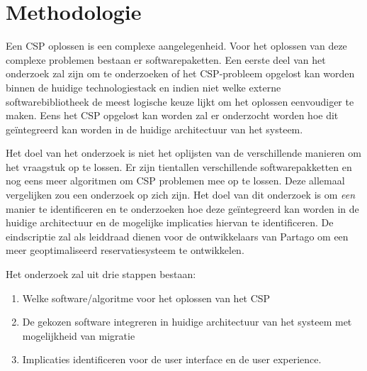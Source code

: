 
\section{Methodologie}
\label{sec:methodologie}
Een CSP oplossen is een complexe aangelegenheid. Voor het oplossen van deze complexe problemen bestaan er softwarepaketten. Een eerste deel van het onderzoek zal zijn om te onderzoeken of het CSP-probleem opgelost kan worden binnen de huidige technologiestack en indien niet welke externe softwarebibliotheek de meest logische keuze lijkt om het oplossen eenvoudiger te maken. Eens het CSP opgelost kan worden zal er onderzocht worden hoe dit geïntegreerd kan worden in de huidige architectuur van het systeem. 

Het doel van het onderzoek is niet het oplijsten van de verschillende manieren om het vraagstuk op te lossen. Er zijn tientallen verschillende softwarepakketten en nog eens meer algoritmen om CSP problemen mee op te lossen. Deze allemaal vergelijken zou een onderzoek op zich zijn. Het doel van dit onderzoek is om \textit{een} manier te identificeren en te onderzoeken hoe deze geïntegreerd kan worden in de huidige architectuur en de mogelijke implicaties hiervan te identificeren. De eindscriptie zal als leiddraad dienen voor de ontwikkelaars van Partago om een meer geoptimaliseerd reservatiesysteem te ontwikkelen. 

Het onderzoek zal uit drie stappen bestaan:
\begin{enumerate}
	\item Welke software/algoritme voor het oplossen van het CSP 
	\item De gekozen software integreren in huidige architectuur van het systeem met mogelijkheid van migratie
	\item Implicaties identificeren voor de user interface en de user experience.
\end{enumerate}

